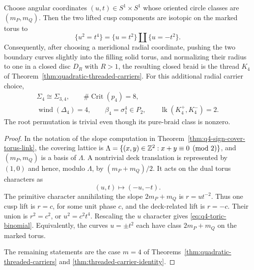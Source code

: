 \begin{corollary}[q=4 cusp link as the polynomial thread]
\label{cor:q4-polynomial-thread}
Choose angular coordinates $(u,t)\in S^1\times S^1$ whose oriented circle
classes are $(m_P,m_Q)$.  Then the two lifted cusp components are isotopic on
the marked torus to
\begin{equation}
 \{u^2=t^4\}
 =\{u=t^2\}\amalg\{u=-t^2\}.
 \label{eq:q4-toric-binomial}
\end{equation}
Consequently, after choosing a meridional radial coordinate, pushing the two
boundary curves slightly into the filling solid torus, and normalizing their
radius to one in a closed disc $D_R$ with $R>1$, the resulting closed braid is
the thread $K_4$ of Theorem~\ref{thm:quadratic-threaded-carriers}.  For this
additional radial carrier choice,
\begin{equation}
 \begin{gathered}
 \Sigma_4\cong\Sigma_{3,4},
 \qquad
 \#\operatorname{Crit}(p_4)=8,\\
 \operatorname{wind}(\Delta_4)=4,
 \qquad
 \beta_4=\sigma_1^4\in P_2,
 \qquad
 \operatorname{lk}(K_4^+,K_4^-)=2.
 \end{gathered}
 \label{eq:q4-threaded-carrier-data}
\end{equation}
The root permutation is trivial even though its pure-braid class is nonzero.
\end{corollary}

\begin{proof}
In the notation of the slope computation in
Theorem~\ref{thm:q4-sign-cover-torus-link}, the covering lattice is
\(
 \Lambda=\{(x,y)\in\mathbb{Z}^2:x+y\equiv0\pmod2\}
\), and $(m_P,m_Q)$ is a basis of $\Lambda$.  A nontrivial deck translation is
represented by $(1,0)$ and hence, modulo $\Lambda$, by
$(m_P+m_Q)/2$.  It acts on the dual torus characters as
\begin{equation}
 (u,t)\longmapsto(-u,-t).
 \label{eq:q4-toric-deck-action}
\end{equation}
The primitive character annihilating the slope $2m_P+m_Q$ is
$r=ut^{-2}$.  Thus one cusp lift is $r=c$, for some unit phase $c$, and the
deck-related lift is $r=-c$.  Their union is
$r^2=c^2$, or $u^2=c^2t^4$.  Rescaling the $u$ character gives
\eqref{eq:q4-toric-binomial}.  Equivalently, the curves $u=\pm t^2$ each have
class $2m_P+m_Q$ on the marked torus.

The remaining statements are the case $m=4$ of
Theorems~\ref{thm:quadratic-threaded-carriers} and
\ref{thm:threaded-carrier-identity}.
\end{proof}

